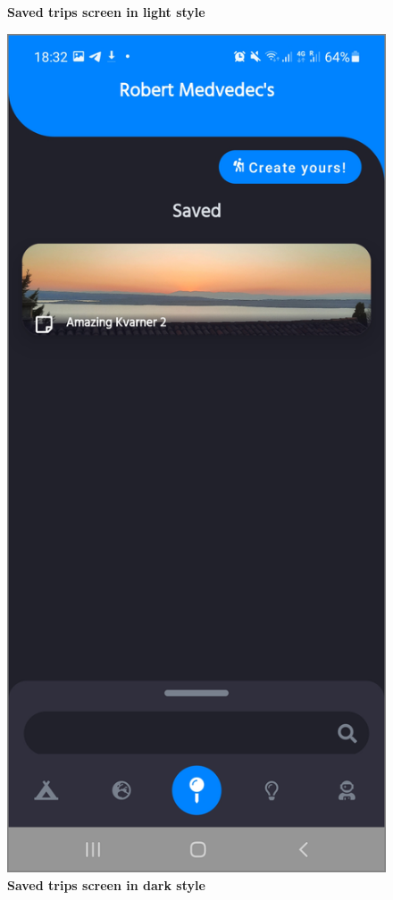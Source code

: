 \begin{figure}[!htb]
\begin{minipage}{.48\textwidth}
\caption{\label{fig:dbapiuser}\textbf{Saved trips screen in light style}}
\end{minipage} 
\begin{minipage}{.48\textwidth}
\centering
\includegraphics[width=.9\textwidth]{../Images/UI/MyTripsDark.jpg}
\caption{\label{fig:dbapiuser}\textbf{Saved trips screen in dark style}}
\end{minipage}
\end{figure}

